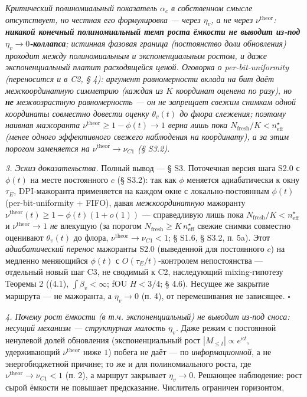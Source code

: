 \documentclass[12pt]{iopart}
\begin{document}
\emph{Критический полиномиальный показатель \(\alpha_c\) в собственном смысле отсутствует, но честная его формулировка --- через \(\eta_v\), а не через \(\nu^{\text{theor}}\): \textbf{никакой конечный полиномиальный темп роста ёмкости не выводит из-под \(\eta_v \to 0\)-коллапса}; истинная фазовая граница (постоянство доли обновления) проходит между полиномиальным и экспоненциальным ростом, и даже экспоненциальный платит расходящейся ценой. Оговорка о per-bit-uniformity (переносится и в C2, § 4): аргумент равномерности вклада на бит даёт \emph{межкоординатную} симметрию (каждая из \(K\) координат оценена по разу), но \textbf{не} \emph{межвозрастную} равномерность --- он не запрещает свежим снимкам одной координаты \emph{совместно} довести оценку \(\theta_v(t)\) до флора слежения; поэтому наивная мажоранта \(\nu^{\text{theor}} \ge 1-\phi(t) \to 1\) верна лишь пока \(N_{\text{fresh}}/K < n_{\text{eff}}^\star\) (менее одного эффективного свежего наблюдения на координату), а за этим порогом заменяется на \(\nu^{\text{theor}} \to \nu_{C1}\) (§ S3.2).}



\emph{3. Эскиз доказательства.} Полный вывод --- § S3. Поточечная версия шага S2.0 с \(\phi(t)\) на месте постоянного \(c\) (§ S3.2): так как \(\phi\) меняется адиабатически к окну \(\tau_E\), DPI-мажоранта применяется на каждом окне с локально-постоянным \(\phi(t)\) (per-bit-uniformity + FIFO), давая \emph{межкоординатную} мажоранту \(\nu^{\text{theor}}(t) \ge 1 - \phi(t)(1+o(1))\) --- справедливую лишь пока \(N_{\text{fresh}}/K < n_{\text{eff}}^\star\) и \(\nu^{\text{theor}} \to 1\) \emph{не} влекущую (за порогом \(N_{\text{fresh}} \ge K\,n_{\text{eff}}^\star\) свежие снимки совместно оценивают \(\theta_v(t)\) до флора, \(\nu^{\text{theor}} \to \nu_{C1} < 1\); § S1.6, § S3.2, п. 5a). Этот \emph{адиабатический перенос} мажоранты S2.0 (выведенной для постоянного \(c\)) на медленно меняющийся \(\phi(t)\) с \(O(\tau_E/t)\)-контролем непостоянства --- отдельный новый шаг C3, не сводимый к C2, наследующий mixing-гипотезу Теоремы 2 ((4.1), \(\int\beta_v<\infty\); fOU \(H<3/4\); § 4.6). Несущее же закрытие маршрута --- не мажоранта, а \(\eta_v \to 0\) (п. 4), от перемешивания не зависящее. \(\square\)



\emph{4. Почему рост ёмкости (в т.ч. экспоненциальный) не выводит из-под сноса: несущий механизм --- структурная малость \(\eta_v\).} Даже режим с постоянной ненулевой долей обновления (экспоненциальный рост \(|M_{\le t}| \propto e^{\kappa t}\), удерживающий \(\nu^{\text{theor}}\) ниже \(1\)) побега не даёт --- по \emph{информационной}, а не энергобюджетной причине; то же и для полиномиального роста, где \(\nu^{\text{theor}} \to \nu_{C1} < 1\) (п. 2), а маршрут закрывает \(\eta_v \to 0\). Решающее наблюдение: рост сырой ёмкости не повышает предсказание. Числитель ограничен горизонтом,
\end{document}
